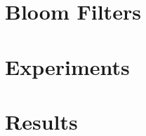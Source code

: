 
\section{Bloom Filters} %
\label{sec:bloom_filters}


\section{Experiments} %
\label{sec:experiments_indexing}


\section{Results} %
\label{sec:results_indexing}


